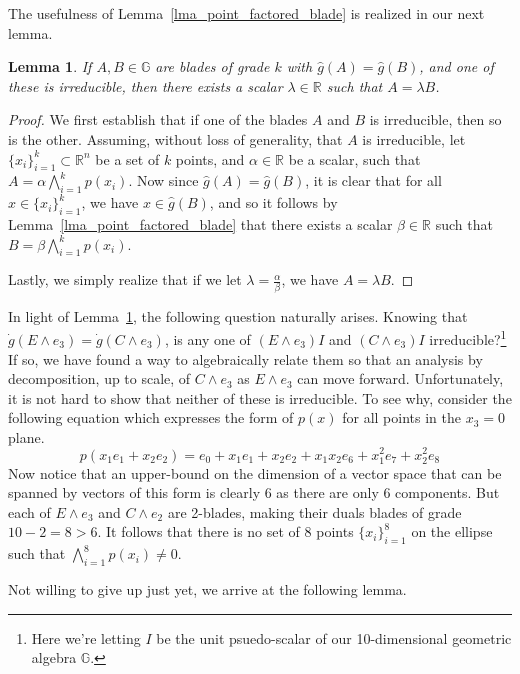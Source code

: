 \documentclass{birkjour}
\newtheorem{lem}[thm]{Lemma}
\theoremstyle{definition}
\theoremstyle{remark}
\numberwithin{equation}{section}
\newcommand{\R}{\mathbb{R}}
\newcommand{\G}{\mathbb{G}}
\newcommand{\gd}{\dot{g}}
\newcommand{\gh}{\hat{g}}
\begin{document}
The usefulness of Lemma~\ref{lma_point_factored_blade} is realized in our next lemma.
\begin{lem}\label{lma_equating_blades}
If $A,B\in\G$ are blades of grade $k$ with $\gh(A)=\gh(B)$, and one of these is irreducible,
then there exists a scalar $\lambda\in\R$ such that $A=\lambda B$.
\end{lem}
\begin{proof}
We first establish that if one of the blades $A$ and $B$ is irreducible, then so is the other.
Assuming, without loss of generality, that $A$ is irreducible, let $\{x_i\}_{i=1}^k\subset\R^n$
be a set of $k$ points, and $\alpha\in\R$ be a scalar, such that $A=\alpha\bigwedge_{i=1}^k p(x_i)$.
Now since $\gh(A)=\gh(B)$, it is clear that for all $x\in\{x_i\}_{i=1}^k$, we have $x\in\gh(B)$,
and so it follows by Lemma~\ref{lma_point_factored_blade} that there exists a scalar $\beta\in\R$
such that $B=\beta\bigwedge_{i=1}^k p(x_i)$.

Lastly, we simply realize that if we let $\lambda=\frac{\alpha}{\beta}$, we have
$A=\lambda B$.
\end{proof}

In light of Lemma~\ref{lma_equating_blades}, the following question naturally arises.
Knowing that $\gd(E\wedge e_3)=\gd(C\wedge e_3)$, is any one of
$(E\wedge e_3)I$ and $(C\wedge e_3)I$ irreducible?\footnote{Here we're letting $I$
be the unit psuedo-scalar of our 10-dimensional geometric algebra $\G$.}  If so, we have found
a way to algebraically relate them so that an analysis by decomposition, up to scale, of $C\wedge e_3$
as $E\wedge e_3$ can move forward.  Unfortunately, it is not hard to show
that neither of these is irreducible.  To see why, consider the following equation which
expresses the form of $p(x)$ for all points in the $x_3=0$ plane.
\begin{equation*}
p(x_1e_1 + x_2e_2) = e_0 + x_1e_1 + x_2e_2 + x_1x_2e_6 + x_1^2e_7 + x_2^2e_8
\end{equation*}
Now notice that an upper-bound on the dimension of a vector space that can
be spanned by vectors of this form is clearly 6 as there are only 6 components.
But each of $E\wedge e_3$ and $C\wedge e_2$ are 2-blades, making their
duals blades of grade $10-2=8>6$.  It follows that there is no set of 8 points $\{x_i\}_{i=1}^8$
on the ellipse such that $\bigwedge_{i=1}^8 p(x_i)\neq 0$.

Not willing to give up just yet, we arrive at the following lemma.
\end{document}

